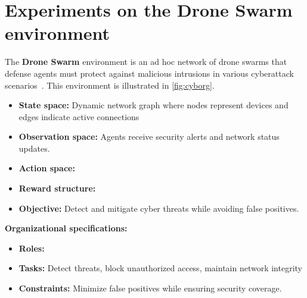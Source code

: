 \section{Experiments on the Drone Swarm environment}

The \textbf{Drone Swarm} environment is an ad hoc network of drone swarms that defense agents must protect against malicious intrusions in various cyberattack scenarios~\cite{Standen2021}. This environment is illustrated in \autoref{fig:cyborg}.

\begin{itemize}
  \item \textbf{State space:} Dynamic network graph where nodes represent devices and edges indicate active connections
  \item \textbf{Observation space: } Agents receive security alerts and network status updates.
  \item \textbf{Action space:}
  \item \textbf{Reward structure:}
  \item \textbf{Objective:} Detect and mitigate cyber threats while avoiding false positives.
\end{itemize}
%
\textbf{Organizational specifications:}
\begin{itemize}
  \item \textbf{Roles:} 
  \item \textbf{Tasks:} Detect threats, block unauthorized access, maintain network integrity
  \item \textbf{Constraints:} Minimize false positives while ensuring security coverage.
\end{itemize}

